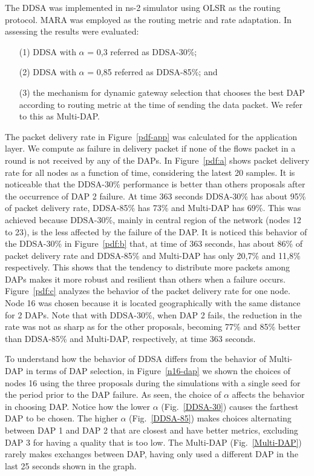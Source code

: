 \documentclass[conference]{IEEEtran}
\begin{document}
The DDSA was implemented in ns-2 simulator using OLSR \cite{clausen2003optimized} as the routing protocol. MARA \cite{6051505} was employed as the routing metric and rate adaptation. In assessing the results were evaluated:

\begin{itemize}
  \item[(1)] DDSA with $\alpha$ = 0,3 referred as DDSA-30\%;
  \item[(2)] DDSA with $\alpha$ = 0,85 referred as DDSA-85\%; and
  \item[(3)] the mechanism for dynamic gateway selection that chooses the best DAP  according to routing metric at the time of sending the data packet. We refer to this as Multi-DAP.
\end{itemize}
 



The packet delivery rate in Figure~\ref{pdf-app} was calculated for the application layer. We compute as failure in delivery packet if none of the flows packet in a round is not received by any of the DAPs.
In Figure~\ref{pdf:a} shows packet delivery rate for all nodes as a function of time, considering the latest 20 samples. It is noticeable that the DDSA-30\% performance is better than others proposals after the occurrence of DAP 2 failure. At time 363 seconds DDSA-30\% has about 95\% of packet delivery rate, DDSA-85\% has 73\% and Multi-DAP has 69\%. 
This was achieved because DDSA-30\%, mainly in central region of the network (nodes 12 to 23), is the less affected by the failure of the DAP. It is noticed this behavior of the DDSA-30\% in Figure~\ref{pdf:b} that, at time of 363 seconds, has about 86\% of packet delivery rate and DDSA-85\% and Multi-DAP has only 20,7\% and 11,8\% respectively. This shows that the tendency to distribute more packets among DAPs makes it more robust and resilient than others when a failure occurs. 
Figure~\ref{pdf:c}  analyzes the behavior of the packet delivery rate for one node. Node 16 was chosen because it is located geographically with the same distance for 2 DAPs. Note that with DDSA-30\%, when DAP 2 fails, the reduction in the rate was not as sharp as for the other proposals, becoming 77\% and 85\% better than DDSA-85\% and Multi-DAP, respectively, at time 363 seconds. 


To understand how the behavior of DDSA differs from the behavior of Multi-DAP in terms of DAP selection, in Figure~\ref{n16-dap} we shown the choices of nodes 16 using the three proposals during the simulations with a single seed for the period prior to the DAP failure. 
As seen, the choice of $\alpha$ affects the behavior in choosing DAP. Notice how the lower $\alpha$ (Fig.~\ref{DDSA-30}) causes the farthest DAP to be chosen.
The higher $\alpha$ (Fig.~\ref{DDSA-85}) makes choices alternating between DAP 1 and DAP 2 that are closest and have better metrics, excluding DAP 3 for having a quality that is too low.
The Multi-DAP (Fig.~\ref{Multi-DAP}) rarely makes exchanges between DAP, having only used a different DAP in the last 25 seconds shown in the graph.
\end{document}
